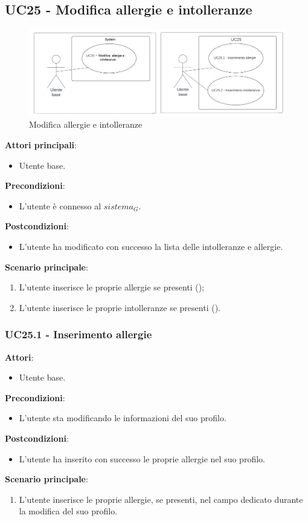 \subsection{UC25 - Modifica allergie e intolleranze}\label{usecase:25}
\begin{figure}[H]
    \centering
    \includegraphics[width=0.75\linewidth]{ucd/ucd25.png}
    \caption{Modifica allergie e intolleranze}
\end{figure}
\textbf{Attori principali}:
\begin{itemize}
    \item Utente base.
\end{itemize}
\textbf{Precondizioni}:
\begin{itemize}
    \item L'utente è connesso al $\textit{sistema}_G$.
\end{itemize}
\textbf{Postcondizioni}:
\begin{itemize}
    \item L'utente ha modificato con successo la lista delle intolleranze e allergie.
\end{itemize}
\textbf{Scenario principale}:
\begin{enumerate}
    \item L'utente inserisce le proprie allergie se presenti ();
    \item L'utente inserisce le proprie intolleranze se presenti ().
\end{enumerate}

  
\subsubsection{UC25.1 - Inserimento allergie}\label{usecase:25_1}
\textbf{Attori}:
\begin{itemize}
    \item Utente base.
\end{itemize}
\textbf{Precondizioni}:
\begin{itemize}
    \item L'utente sta modificando le informazioni del suo profilo.
\end{itemize}
\textbf{Postcondizioni}:
\begin{itemize}
    \item L'utente ha inserito con successo le proprie allergie nel suo profilo.
\end{itemize}
\textbf{Scenario principale}:
\begin{enumerate}
    \item L'utente inserisce le proprie allergie, se presenti, nel campo dedicato durante la modifica del suo profilo.
\end{enumerate}

